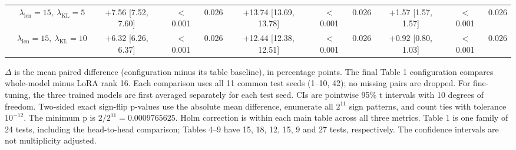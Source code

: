 \documentclass[10pt,letterpaper]{article}
\begin{document}
\begin{table}[!htb]
{\begin{tabular}{lcccccccccc}
 & $\lambda_{\mathrm{len}}=15,\ \lambda_{\mathrm{KL}}=5$ & +7.56 [7.52, 7.60] & $<$0.001 & 0.026 & +13.74 [13.69, 13.78] & $<$0.001 & 0.026 & +1.57 [1.57, 1.57] & $<$0.001 & 0.026 \\
 & $\lambda_{\mathrm{len}}=15,\ \lambda_{\mathrm{KL}}=10$ & +6.32 [6.26, 6.37] & $<$0.001 & 0.026 & +12.44 [12.38, 12.51] & $<$0.001 & 0.026 & +0.92 [0.80, 1.03] & $<$0.001 & 0.026 \\
\bottomrule
\end{tabular}}
\begin{flushleft}\footnotesize $\Delta$ is the mean paired difference (configuration minus its table baseline), in percentage points. The final Table 1 configuration compares whole-model minus LoRA rank 16. Each comparison uses all 11 common test seeds (1--10, 42); no missing pairs are dropped. For fine-tuning, the three trained models are first averaged separately for each test seed. CIs are pointwise 95\% t intervals with 10 degrees of freedom. Two-sided exact sign-flip p-values use the absolute mean difference, enumerate all $2^{11}$ sign patterns, and count ties with tolerance $10^{-12}$. The minimum p is $2/2^{11}=0.0009765625$. Holm correction is within each main table across all three metrics. Table 1 is one family of 24 tests, including the head-to-head comparison; Tables 4--9 have 15, 18, 12, 15, 9 and 27 tests, respectively. The confidence intervals are not multiplicity adjusted.\end{flushleft}
\end{table}
\end{document}
